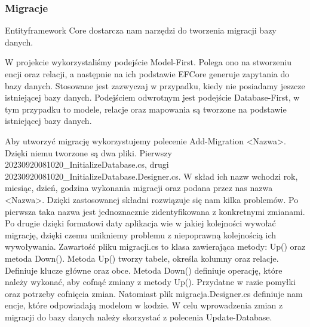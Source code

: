\documentclass[a4paper,twoside,12pt]{book}
\begin{document}
\subsubsection{Migracje}
Entityframework Core dostarcza nam narzędzi do tworzenia migracji bazy danych.  

W projekcie wykorzystaliśmy podejście Model-First. Polega ono na stworzeniu encji oraz relacji, a następnie na ich podstawie EFCore generuje zapytania do bazy danych. Stosowane jest zazwyczaj w przypadku, kiedy nie posiadamy jeszcze istniejącej bazy danych. Podejściem odwrotnym jest podejście Database-First, w tym przypadku to modele, relacje oraz mapowania są tworzone na podstawie istniejącej bazy danych. 

Aby utworzyć migrację wykorzystujemy polecenie Add-Migration <Nazwa>. Dzięki niemu tworzone są dwa pliki. Pierwszy 20230920081020\_InitializeDatabase.cs, drugi 20230920081020\_InitializeDatabase.Designer.cs. W skład ich nazw wchodzi rok, miesiąc, dzień, godzina wykonania migracji oraz podana przez nas nazwa <Nazwa>. Dzięki zastosowanej składni rozwiązuje się nam kilka problemów. Po pierwsza taka nazwa jest jednoznacznie zidentyfikowana z konkretnymi zmianami. Po drugie dzięki formatowi daty aplikacja wie w jakiej kolejności wywołać migrację, dzięki czemu unikniemy problemu z niepoprawną kolejnością ich wywoływania. 
Zawartość pliku migracji.cs to klasa zawierająca metody: Up() oraz metoda Down(). Metoda Up() tworzy tabele, określa kolumny oraz relacje. Definiuje klucze główne oraz obce. Metoda Down() definiuje operację, które należy wykonać, aby cofnąć zmiany z metody Up(). Przydatne w razie pomyłki oraz potrzeby cofnięcia zmian.
Natomiast plik migracja.Designer.cs definiuje nam encje, które odpowiadają modelom w kodzie.
W celu wprowadzenia zmian z migracji do bazy danych należy skorzystać z polecenia Update-Database.
\end{document}
